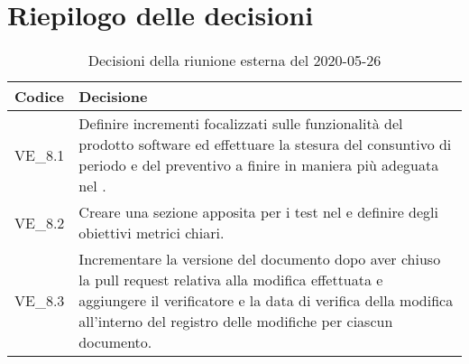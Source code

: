\section{Riepilogo delle decisioni}
\begin{longtable}{
	 >{\centering}p{} >{}p{} }
	\caption{Decisioni della riunione esterna del 2020-05-26}\\

	\textbf{\color{white}Codice} &
	\textbf{\color{white}Decisione}
	\tabularnewline
	\endhead

	VE\_8.1 & Definire incrementi focalizzati sulle funzionalità del prodotto software ed effettuare la stesura del consuntivo di periodo e del preventivo a finire in maniera più adeguata nel \PdP. \\
	VE\_8.2 & Creare una sezione apposita per i test nel \PdQ{} e definire degli obiettivi metrici chiari. \\
	VE\_8.3 & Incrementare la versione del documento dopo aver chiuso la pull request relativa alla modifica effettuata e aggiungere il verificatore e la data di verifica della modifica all'interno del registro delle modifiche per ciascun documento. \\
\end{longtable}
